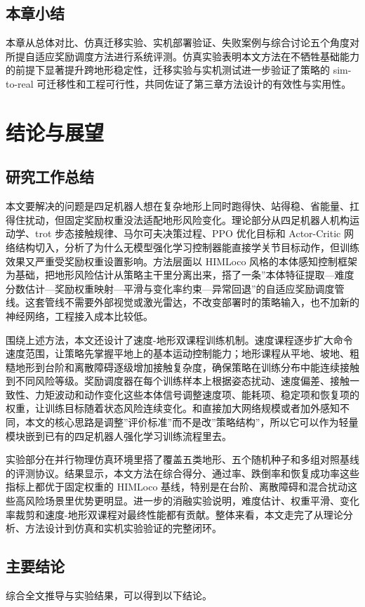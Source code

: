 \documentclass[12pt,a4paper]{ctexart}
\numberwithin{equation}{section}
\numberwithin{table}{section}
\numberwithin{figure}{section}
\begin{document}
\subsection{本章小结}
本章从总体对比、仿真迁移实验、实机部署验证、失败案例与综合讨论五个角度对所提自适应奖励调度方法进行系统评测。仿真实验表明本文方法在不牺牲基础能力的前提下显著提升跨地形稳定性，迁移实验与实机测试进一步验证了策略的 sim-to-real 可迁移性和工程可行性，共同佐证了第三章方法设计的有效性与实用性。


\clearpage
\section{结论与展望}\label{sec:future}
\subsection{研究工作总结}
本文要解决的问题是四足机器人想在复杂地形上同时跑得快、站得稳、省能量、扛得住扰动，但固定奖励权重没法适配地形风险变化。理论部分从四足机器人机构运动学、trot 步态接触规律、马尔可夫决策过程、PPO 优化目标和 Actor-Critic 网络结构切入，分析了为什么无模型强化学习控制器能直接学关节目标动作，但训练效果又严重受奖励权重设置影响。方法层面以 HIMLoco 风格的本体感知控制框架为基础，把地形风险估计从策略主干里分离出来，搭了一条”本体特征提取—难度分数估计—奖励权重映射—平滑与变化率约束—异常回退”的自适应奖励调度管线。这套管线不需要外部视觉或激光雷达，不改变部署时的策略输入，也不加新的神经网络，工程接入成本比较低。

围绕上述方法，本文还设计了速度-地形双课程训练机制。速度课程逐步扩大命令速度范围，让策略先掌握平地上的基本运动控制能力；地形课程从平地、坡地、粗糙地形到台阶和离散障碍逐级增加接触复杂度，确保策略在训练分布中能连续接触到不同风险等级。奖励调度器在每个训练样本上根据姿态扰动、速度偏差、接触一致性、力矩波动和动作变化这些本体信号调整速度项、能耗项、稳定项和恢复项的权重，让训练目标随着状态风险连续变化。和直接加大网络规模或者加外感知不同，本文的核心思路是调整”评价标准”而不是改”策略结构”，所以它可以作为轻量模块嵌到已有的四足机器人强化学习训练流程里去。

实验部分在并行物理仿真环境里搭了覆盖五类地形、五个随机种子和多组对照基线的评测协议。结果显示，本文方法在综合得分、通过率、跌倒率和恢复成功率这些指标上都优于固定权重的 HIMLoco 基线，特别是在台阶、离散障碍和混合扰动这些高风险场景里优势更明显。进一步的消融实验说明，难度估计、权重平滑、变化率裁剪和速度-地形双课程对最终性能都有贡献。整体来看，本文走完了从理论分析、方法设计到仿真和实机实验验证的完整闭环。

\subsection{主要结论}
综合全文推导与实验结果，可以得到以下结论。
\end{document}
